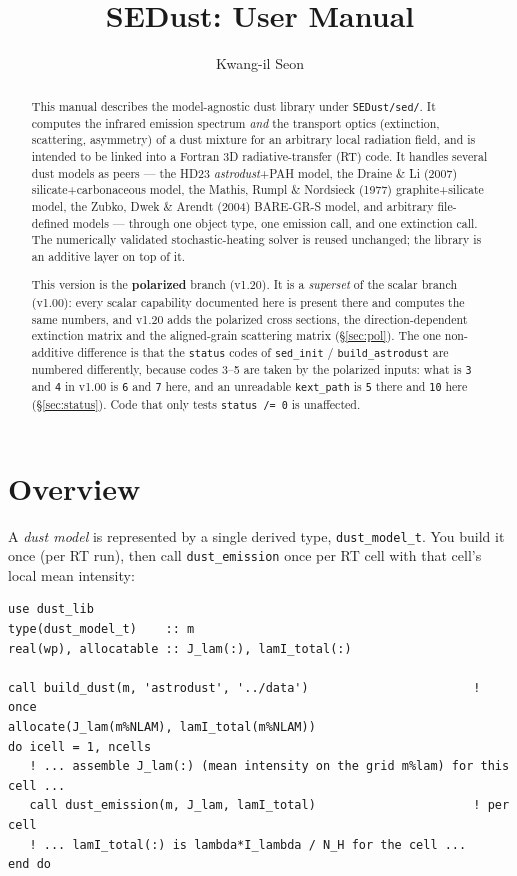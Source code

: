 \documentclass{my_memo}
\title{SEDust: User Manual}
\author{Kwang-il Seon}
\date{\docmoddate}
\newcommand{\code}[1]{\texttt{#1}}
\begin{document}
\maketitle

\begin{abstract}
\noindent
This manual describes the model-agnostic dust library under \code{SEDust/sed/}.
It computes the infrared emission spectrum \emph{and} the transport optics
(extinction, scattering, asymmetry) of a dust mixture for an arbitrary local
radiation field, and is intended to be linked into a Fortran 3D
radiative-transfer (RT) code. It handles several dust models as peers --- the
HD23 \emph{astrodust}+PAH model, the Draine \& Li (2007) silicate+carbonaceous
model, the Mathis, Rumpl \& Nordsieck (1977) graphite+silicate model, the
Zubko, Dwek \& Arendt (2004) BARE-GR-S model, and arbitrary file-defined
models --- through one object type, one emission call, and one extinction
call. The numerically validated stochastic-heating solver is reused
unchanged; the library is an additive layer on top of it.

This version is the \textbf{polarized} branch (v1.20). It is a
\emph{superset} of the scalar branch (v1.00): every scalar capability
documented here is present there and computes the same numbers, and v1.20 adds
the polarized cross sections, the direction-dependent extinction matrix and the
aligned-grain scattering matrix (\S\ref{sec:pol}). The one non-additive
difference is that the \code{status} codes of \code{sed\_init} /
\code{build\_astrodust} are numbered differently, because codes 3--5 are taken
by the polarized inputs: what is \code{3} and \code{4} in v1.00 is \code{6} and
\code{7} here, and an unreadable \code{kext\_path} is \code{5} there and
\code{10} here (\S\ref{sec:status}). Code that only tests \code{status /= 0} is
unaffected.
\end{abstract}

\tableofcontents

\section{Overview}

A \emph{dust model} is represented by a single derived type,
\code{dust\_model\_t}. You build it once (per RT run), then call
\code{dust\_emission} once per RT cell with that cell's local mean intensity:

\begin{lstlisting}
use dust_lib
type(dust_model_t)    :: m
real(wp), allocatable :: J_lam(:), lamI_total(:)

call build_dust(m, 'astrodust', '../data')                       ! once
allocate(J_lam(m%NLAM), lamI_total(m%NLAM))
do icell = 1, ncells
   ! ... assemble J_lam(:) (mean intensity on the grid m%lam) for this cell ...
   call dust_emission(m, J_lam, lamI_total)                      ! per cell
   ! ... lamI_total(:) is lambda*I_lambda / N_H for the cell ...
end do
\end{lstlisting}
\end{document}
